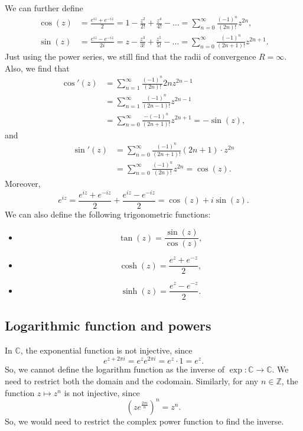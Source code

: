\documentclass[a4paper, openany]{memoir}
\theoremstyle{definition}
\theoremstyle{plain}
\begin{document}
We can further define
\begin{align*}
    \cos (z) &= \frac{e^{iz} + e^{-iz}}{2} = 1 - \frac{z^2}{2!} + \frac{z^4}{4!} - \dots = \sum_{n=0}^{\infty} \frac{(-1)^n}{(2n)!} z^{2n}, \\
    \sin (z) &= \frac{e^{iz} - e^{-iz}}{2i} = z - \frac{z^3}{3!} + \frac{z^5}{5!} - \dots = \sum_{n=0}^{\infty} \frac{(-1)^n}{(2n+1)!} z^{2n+1}.
\end{align*}
Just using the power series, we still find that the radii of convergence $R = \infty$. Also, we find that
\begin{align*}
    \cos'(z) &= \sum_{n=1}^{\infty} \frac{(-1)^n}{(2n)!} 2n z^{2n-1} \\
    &= \sum_{n=1}^{\infty} \frac{(-1)^n}{(2n-1)!} z^{2n-1} \\
    &= \sum_{n=0}^{\infty} \frac{-(-1)^n}{(2n+1)!} z^{2n+1} = -\sin(z),
\end{align*}
and
\begin{align*}
    \sin'(z) &= \sum_{n=0}^{\infty} \frac{(-1)^n}{(2n+1)!} (2n+1) \cdot z^{2n} \\
    &= \sum_{n=0}^{\infty} \frac{(-1)^n}{(2n)!} z^{2n} = \cos (z).
\end{align*}
Moreover,
\[e^{iz} = \frac{e^{iz} + e^{-iz}}{2} + \frac{e^{iz} - e^{-iz}}{2} = \cos (z) + i \sin (z).\]
We can also define the following trigonometric functions:
\begin{itemize}
    \item \[\tan (z) = \frac{\sin (z)}{\cos (z)},\]
    \item \[\cosh (z) = \frac{e^z + e^{-z}}{2},\]
    \item \[\sinh (z) = \frac{e^z - e^{-z}}{2}.\]
\end{itemize}

\subsection{Logarithmic function and powers}
In $\mathbb{C}$, the exponential function is not injective, since 
\[e^{z + 2\pi i} = e^z e^{2\pi i} = e^z \cdot 1 = e^z.\]
So, we cannot define the logarithm function as the inverse of $\exp: \mathbb{C} \to \mathbb{C}$. We need to restrict both the domain and the codomain. Similarly, for any $n \in \mathbb{Z}$, the function $z \mapsto z^n$ is not injective, since
\[(z e^{\frac{2\pi i}{n}})^n = z^n.\]
So, we would need to restrict the complex power function to find the inverse. 
\end{document}
